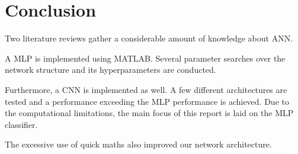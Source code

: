 \section{Conclusion}
     \pagestyle{mario}
     
Two literature reviews gather a considerable amount of knowledge about ANN.     

A MLP is implemented using MATLAB. Several parameter searches over the network structure and its hyperparameters are conducted.

Furthermore, a CNN is implemented as well. A few different architectures are tested and a performance exceeding the MLP performance is achieved. Due to the computational limitations, the main focus of this report is laid on the MLP classifier.     
     
The excessive use of quick maths also improved our network architecture.